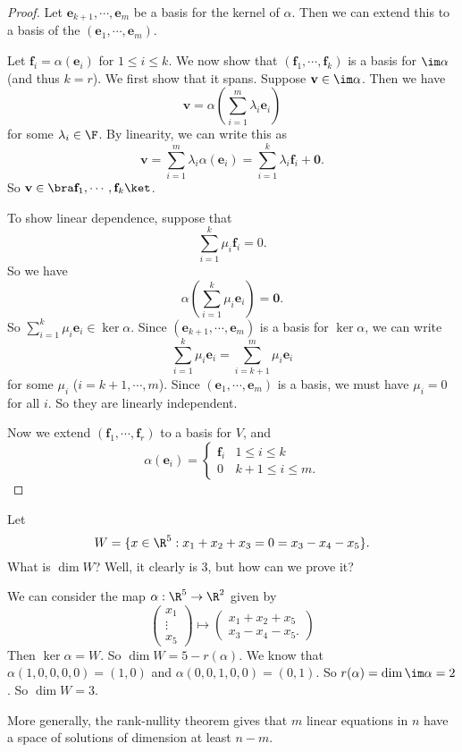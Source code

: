 \documentclass[a4paper]{article}
\begin{document}
\begin{proof}
  Let $\mathbf{e}_{k + 1}, \cdots, \mathbf{e}_m$ be a basis for the kernel of $\alpha$. Then we can extend this to a basis of the $(\mathbf{e}_1,\cdots, \mathbf{e}_m)$.

  Let $\mathbf{f}_i = \alpha(\mathbf{e}_i)$ for $1 \leq i \leq k$. We now show that $(\mathbf{f}_1, \cdots, \mathbf{f}_k)$ is a basis for $\im \alpha$ (and thus $k = r$). We first show that it spans. Suppose $\mathbf{v}\in \im \alpha$. Then we have
  \[
    \mathbf{v} = \alpha\left(\sum_{i = 1}^m \lambda_i \mathbf{e}_i\right)
  \]
  for some $\lambda_i \in \F$. By linearity, we can write this as
  \[
    \mathbf{v} = \sum_{i = 1}^m \lambda_i \alpha(\mathbf{e}_i) = \sum_{i = 1}^k \lambda_i \mathbf{f}_i + \mathbf{0}.
  \]
  So $\mathbf{v}\in \bra \mathbf{f}_1, \cdots, \mathbf{f}_k\ket$.

  To show linear dependence, suppose that
  \[
    \sum_{i = 1}^k \mu_i \mathbf{f}_i = 0.
  \]
  So we have
  \[
    \alpha \left(\sum_{i = 1}^k \mu_i \mathbf{e}_i\right) = \mathbf{0}.
  \]
  So $\sum_{i = 1}^k \mu_i \mathbf{e}_i \in \ker \alpha$. Since $(\mathbf{e}_{k + 1}, \cdots, \mathbf{e}_m)$ is a basis for $\ker \alpha$, we can write
  \[
    \sum_{i = 1}^k \mu_i \mathbf{e}_i = \sum_{i = k + 1}^m \mu_i \mathbf{e}_i
  \]
  for some $\mu_i$ ($i = k + 1, \cdots, m$). Since $(\mathbf{e}_1, \cdots, \mathbf{e}_m)$ is a basis, we must have $\mu_i = 0$ for all $i$. So they are linearly independent.

  Now we extend $(\mathbf{f}_1, \cdots, \mathbf{f}_r)$ to a basis for $V$, and
  \[
    \alpha(\mathbf{e}_i) =
    \begin{cases}
      \mathbf{f}_i & 1 \leq i \leq k\\
      0 & k + 1 \leq i \leq m.
    \end{cases}
  \]
\end{proof}

\begin{eg}
  Let
  \[
    W = \{x\in \R^5: x_1 + x_2 + x_3 = 0 = x_3 - x_4 - x_5\}.
  \]
  What is $\dim W$? Well, it clearly is $3$, but how can we prove it?

  We can consider the map $\alpha: \R^5 \to \R^2$ given by
  \[
    \begin{pmatrix}
      x_1\\\vdots \\ x_5
    \end{pmatrix}
    \mapsto
    \begin{pmatrix}
      x_1 + x_2 + x_5\\
      x_3 - x_4 - x_5.
    \end{pmatrix}
  \]
  Then $\ker \alpha = W$. So $\dim W = 5 - r(\alpha)$. We know that $\alpha(1, 0, 0, 0, 0) = (1, 0)$ and $\alpha(0, 0, 1, 0, 0) = (0, 1)$. So $r(\alpha) = \dim \im \alpha = 2$. So $\dim W = 3$.
\end{eg}
More generally, the rank-nullity theorem gives that $m$ linear equations in $n$ have a space of solutions of dimension at least $n - m$.
\end{document}
